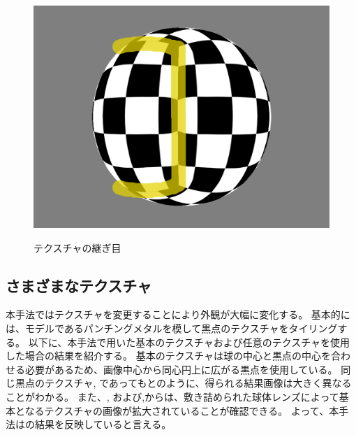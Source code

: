 \begin{figure}[htbp]
{\includegraphics*[width=.45\columnwidth]{./img/screenshot/sphere/Distortion/tex_tortion3.png}
\label{FTexTortion3}}
\\
  \caption{テクスチャの継ぎ目}
  \label{FTexTortion}
\end{figure}

\newpage
\subsection{さまざまなテクスチャ}%
\label{SS}

本手法ではテクスチャを変更することにより外観が大幅に変化する。
基本的には、モデルであるパンチングメタルを模して黒点のテクスチャをタイリングする。
以下に、本手法で用いた基本のテクスチャおよび任意のテクスチャを使用した場合の結果を紹介する。
基本のテクスチャは球の中心と黒点の中心を合わせる必要があるため、画像中心から同心円上に広がる黒点を使用している。
同じ黒点のテクスチャ, であってもとのように、得られる結果画像は大きく異なることがわかる。
また、, および,からは、敷き詰められた球体レンズによって基本となるテクスチャの画像が拡大されていることが確認できる。
よって、本手法はの結果を反映していると言える。


